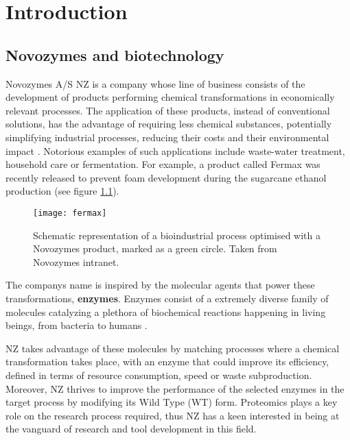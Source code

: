 \chapter{Introduction}
\label{chap:introduction}



\section{Novozymes and biotechnology}


Novozymes A/S \ac{NZ} is a company whose line of business consists of the development of products performing chemical transformations in economically relevant processes. The application of these products, instead of conventional solutions, has the advantage of requiring less chemical substances, potentially simplifying industrial processes, reducing their costs and their environmental impact \cite{madigan2000brock}. Notorious examples of such applications include waste-water treatment, household care or fermentation. For example, a product called Fermax was recently released to prevent foam development during the sugarcane ethanol production (see figure \ref{fig:ethanol}).

\begin{figure}[!h]
\centering
  \texttt{[image: fermax]}
\caption[Example of bioprocess optimised by Novozymes]{Schematic representation of a bioindustrial process optimised with a Novozymes product, marked as a green circle. Taken from Novozymes intranet.}
\label{fig:ethanol}
\end{figure}

The company\textquotesingle s name is inspired by the molecular agents that power these transformations, \textbf{enzymes}. Enzymes consist of a extremely diverse family of molecules catalyzing a plethora of biochemical reactions happening in living beings, from bacteria to humans \cite{Nelson2008}. 

\ac{NZ} takes advantage of these molecules by matching processes where a chemical transformation takes place, with an enzyme that could improve its efficiency, defined in terms of resource consumption, speed or waste subproduction. Moreover, \ac{NZ} thrives to improve the performance of the selected enzymes in the target process by modifying its Wild Type (WT) form. Proteomics plays a key role on the research process required, thus \ac{NZ} has a keen interested in being at the vanguard of research and tool development in this field.

